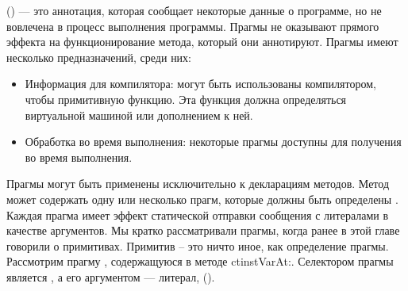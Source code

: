 \documentclass[a4paper,10pt,twoside]{book}
\begin{document}
 () --- это аннотация, которая сообщает некоторые данные о программе, но не вовлечена в процесс выполнения программы. Прагмы не оказывают прямого эффекта на функционирование метода, который они аннотируют.
Прагмы имеют несколько предназначений, среди них:
\begin{itemize}
\item Информация для компилятора:  могут быть использованы компилятором, чтобы  примитивную функцию. Эта функция должна определяться виртуальной машиной или дополнением к ней.
\item Обработка во время выполнения: некоторые прагмы доступны для получения во время выполнения.
\end{itemize}

Прагмы могут быть применены исключительно к декларациям методов. Метод может содержать одну или несколько прагм, которые должны быть определены . Каждая прагма имеет эффект статической отправки сообщения с литералами в качестве аргументов.
Мы кратко рассматривали прагмы, когда ранее в этой главе говорили о примитивах. Примитив -- это ничто иное, как определение прагмы.
Рассмотрим прагму , содержащуюся в методе ct{instVarAt:}. Селектором прагмы является , а его аргументом --- литерал,  ().
\end{document}
